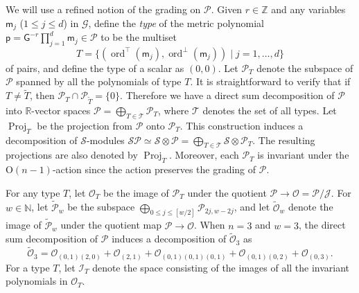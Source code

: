 \documentclass[11pt]{amsart}
\newcommand{\ord}{\operatorname{ord}}
\newcommand{\Ogroup}[1]{\mathrm O({#1})}
\newcommand{\Proj}{\operatorname{Proj}}
\theoremstyle{definition}
\numberwithin{equation}{section}
\begin{document}
 
 We will use a refined notion of the grading on $\mathcal P$. Given  $r\in\mathbb Z$ and any variables $\mathsf m_j$ ($1 \le j \le d$) in $\mathcal G$, define the {\em  type} of the metric polynomial  $\mathsf p = \mathsf G^{-r}\prod_{j=1}^d\mathsf m_j\in\mathcal P$ to be the multiset 
 \[T = \{(\ord^\top(\mathsf m_j),\ord^\bot(\mathsf m_j))\mid j=1,\dots,d\}\] 
 of pairs, and define the type of a scalar as $(0,0)$. Let $\mathcal P_T$ denote the subspace of $\mathcal P$ spanned by all the polynomials of type $T$. It is straightforward to verify that if $T \neq \widetilde T$, then   $\mathcal P_T \cap \mathcal P_{\widetilde T} = \{0\}$. Therefore we have a direct sum decomposition of $\mathcal P$ into $\mathbb R$-vector spaces $\mathcal P = \bigoplus_{T\in\mathcal T}\mathcal P_T$, where $\mathcal T$ denotes the set of all types.   Let $\Proj_T$ be the projection from $\mathcal P$ onto $\mathcal P_T$. 
 This construction induces a decomposition of $\mathcal S$-modules $\mathcal {SP}\simeq\mathcal S\otimes \mathcal P = \bigoplus_{T\in\mathcal T}\mathcal S\otimes\mathcal P_T$. The resulting projections are also denoted by $\Proj_T$. Moreover, each $\mathcal P_T$ is invariant under the $\Ogroup{n-1}$-action since the action preserves the grading of $\mathcal P$.
 
 
%
For any type $T$, let $\mathcal O_T$ be the image of   $\mathcal P_T$ under the quotient $\mathcal P \to \mathcal O=\mathcal P/\mathcal J$. 
For $w\in\mathbb N$, let $\widetilde{\mathcal P}_w$ be the subspace $\bigoplus_{0\le j\le [w/2]}\mathcal P_{2j,w-2j}$, and let  $\widetilde{\mathcal O}_w$ denote the image of $\widetilde{\mathcal P}_w$ under the quotient map $\mathcal P\to\mathcal O$.
When $n=3$ and $w=3$, the direct sum decomposition of $\mathcal P$ induces a decomposition of $\widetilde{\mathcal O}_3$ as 
\[\widetilde{\mathcal O}_3 = \mathcal O_{(0,1)(2,0)} + \mathcal O_{(2,1)} + \mathcal O_{(0,1)(0,1)(0,1)} + \mathcal O_{(0,1)(0,2)} + \mathcal O_{(0,3)}.\]
For a type $T$, let $\mathcal I_T$ denote the space consisting of the images of  all the invariant polynomials in $\mathcal O_T$.
 
\end{document}
